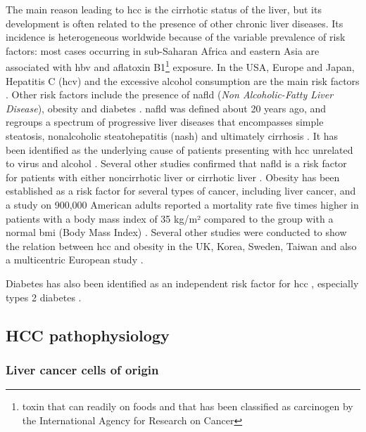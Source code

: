 The main reason leading to \ac{hcc} is the cirrhotic status of the
liver, but its development is often related to the presence of other
chronic liver diseases.
Its incidence is heterogeneous worldwide because of the variable
prevalence of risk factors: most cases occurring in sub-Saharan Africa
and eastern Asia are associated with \ac{hbv} and aflatoxin B1\footnote{toxin that can readily on foods and that has been classified as carcinogen by the International Agency for Research on Cancer}
exposure. In the USA, Europe and Japan, Hepatitis C (\ac{hcv}) and the
excessive alcohol consumption are the main risk factors \cite{Forner2018}. 
Other risk factors include the presence of \ac{nafld} (\emph{Non Alcoholic-Fatty Liver
Disease}), obesity and diabetes \cite{Marengo2016}. 
\ac{nafld} was defined about 20 years ago, and regroups a spectrum of
progressive liver diseases that encompasses simple steatosis,
nonalcoholic steatohepatitis (\ac{nash}) and ultimately cirrhosis
\cite{Marengo2016}. It has been identified as the
underlying cause of patients presenting with \ac{hcc} unrelated to
virus and alcohol \cite{Marrero2002}.
Several other studies confirmed that \ac{nafld} is a risk factor for
patients with either noncirrhotic liver \cite{Paradis2009, Dyson2014} or cirrhotic liver \cite{Wong2014, Ascha2010, Mittal2015}.
Obesity has been established as a risk factor for several types of
cancer, including liver cancer, and a study on 900,000 American adults
reported a mortality rate five times higher in patients with a body mass
index of 35 kg/m² compared to the group with a normal \ac{bmi} (Body Mass Index) \cite{Calle2003}. Several other studies were conducted to show
the relation between \ac{hcc} and obesity in the UK, Korea, Sweden, Taiwan
and also a multicentric European study \cite{Chen2008, Schlesinger2012, Samanic2006, Oh2005, Batty2005}.

Diabetes has also been identified as an independent risk factor for \ac{hcc}
\cite{Forner2018}, especially types 2 diabetes \cite{Noto2010,Wideroff1997,El-Serag2004,Davila2005,Inoue2006}.


\subsection{HCC pathophysiology}\label{hcc_pathophysiology}

\subsubsection{Liver cancer cells of origin}\label{cells-of-origin-of-liver-cancer}

